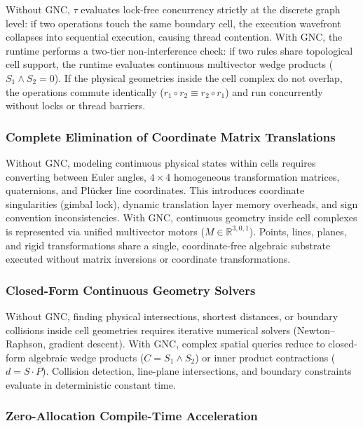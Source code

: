 \documentclass[manuscript, nonacm, review=false]{acmart}
\theoremstyle{definition}
\theoremstyle{plain}
\newcommand{\R}{\mathbb{R}}
\newcommand{\toposLang}{\ensuremath{\tau}\text{-Lang}}
\begin{document}
Without GNC, \toposLang{} evaluates lock-free concurrency strictly at the discrete graph level: if two operations touch the same boundary cell, the execution wavefront collapses into sequential execution, causing thread contention. With GNC, the runtime performs a two-tier non-interference check: if two rules share topological cell support, the runtime evaluates continuous multivector wedge products ($S_1 \wedge S_2 = 0$). If the physical geometries inside the cell complex do not overlap, the operations commute identically ($r_1 \circ r_2 \equiv r_2 \circ r_1$) and run concurrently without locks or thread barriers.

\subsubsection{Complete Elimination of Coordinate Matrix Translations}

Without GNC, modeling continuous physical states within cells requires converting between Euler angles, $4 \times 4$ homogeneous transformation matrices, quaternions, and Pl\"ucker line coordinates. This introduces coordinate singularities (gimbal lock), dynamic translation layer memory overheads, and sign convention inconsistencies. With GNC, continuous geometry inside cell complexes is represented via unified multivector motors ($M \in \R^{3,0,1}$). Points, lines, planes, and rigid transformations share a single, coordinate-free algebraic substrate executed without matrix inversions or coordinate transformations.

\subsubsection{Closed-Form Continuous Geometry Solvers}

Without GNC, finding physical intersections, shortest distances, or boundary collisions inside cell geometries requires iterative numerical solvers (Newton--Raphson, gradient descent). With GNC, complex spatial queries reduce to closed-form algebraic wedge products ($C = S_1 \wedge S_2$) or inner product contractions ($d = S \cdot P$). Collision detection, line-plane intersections, and boundary constraints evaluate in deterministic constant time.

\subsubsection{Zero-Allocation Compile-Time Acceleration}
\end{document}
